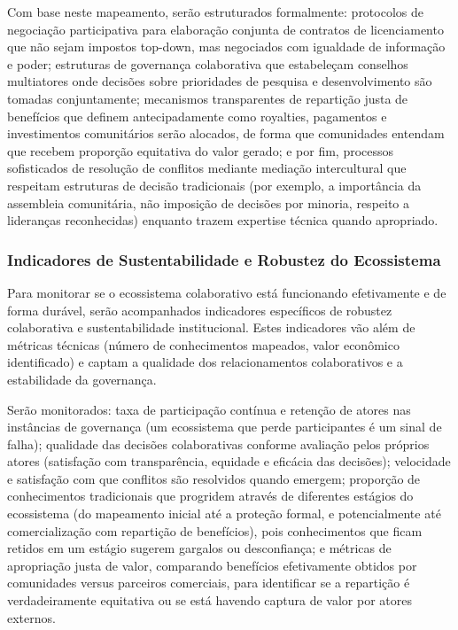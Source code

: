 Com base neste mapeamento, serão estruturados formalmente: protocolos de negociação participativa para elaboração conjunta de contratos de licenciamento que não sejam impostos top-down, mas negociados com igualdade de informação e poder; estruturas de governança colaborativa que estabeleçam conselhos multiatores onde decisões sobre prioridades de pesquisa e desenvolvimento são tomadas conjuntamente; mecanismos transparentes de repartição justa de benefícios que definem antecipadamente como royalties, pagamentos e investimentos comunitários serão alocados, de forma que comunidades entendam que recebem proporção equitativa do valor gerado; e por fim, processos sofisticados de resolução de conflitos mediante mediação intercultural que respeitam estruturas de decisão tradicionais (por exemplo, a importância da assembleia comunitária, não imposição de decisões por minoria, respeito a lideranças reconhecidas) enquanto trazem expertise técnica quando apropriado.

\subsubsection{Indicadores de Sustentabilidade e Robustez do Ecossistema}

Para monitorar se o ecossistema colaborativo está funcionando efetivamente e de forma durável, serão acompanhados indicadores específicos de robustez colaborativa e sustentabilidade institucional. Estes indicadores vão além de métricas técnicas (número de conhecimentos mapeados, valor econômico identificado) e captam a qualidade dos relacionamentos colaborativos e a estabilidade da governança. 

Serão monitorados: taxa de participação contínua e retenção de atores nas instâncias de governança (um ecossistema que perde participantes é um sinal de falha); qualidade das decisões colaborativas conforme avaliação pelos próprios atores (satisfação com transparência, equidade e eficácia das decisões); velocidade e satisfação com que conflitos são resolvidos quando emergem; proporção de conhecimentos tradicionais que progridem através de diferentes estágios do ecossistema (do mapeamento inicial até a proteção formal, e potencialmente até comercialização com repartição de benefícios), pois conhecimentos que ficam retidos em um estágio sugerem gargalos ou desconfiança; e métricas de apropriação justa de valor, comparando benefícios efetivamente obtidos por comunidades versus parceiros comerciais, para identificar se a repartição é verdadeiramente equitativa ou se está havendo captura de valor por atores externos.



